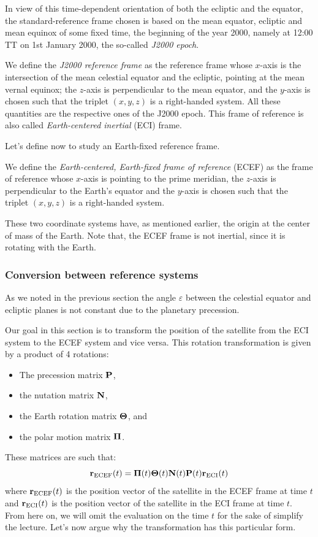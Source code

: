 \documentclass[../main.tex]{subfiles}
\begin{document}
In view of this time-dependent orientation of both the ecliptic and the equator, the standard-reference frame chosen is based on the mean equator, ecliptic and mean equinox of some fixed time, the beginning of the year 2000, namely at 12:00 TT on 1st January 2000, the so-called \emph{J2000 epoch}.
\begin{definition}
  We define the \emph{J2000 reference frame} as the reference frame whose $x$-axis is the intersection of the mean celestial equator and the ecliptic, pointing at the mean vernal equinox; the $z$-axis is perpendicular to the mean equator, and the $y$-axis is chosen such that the triplet $(x,y,z)$ is a right-handed system. All these quantities are the respective ones of the J2000 epoch. This frame of reference is also called \emph{Earth-centered inertial} (ECI) frame.
\end{definition}

Let's define now to study an Earth-fixed reference frame.
\begin{definition}
  We define the \emph{Earth-centered, Earth-fixed frame of reference} (ECEF) as the frame of reference whose $x$-axis is pointing to the prime meridian, the $z$-axis is perpendicular to the Earth's equator and the $y$-axis is chosen such that the triplet $(x,y,z)$ is a right-handed system.
\end{definition}
These two coordinate systems have, as mentioned earlier, the origin at the center of mass of the Earth. Note that, the ECEF frame is not inertial, since it is rotating with the Earth.
\subsubsection{Conversion between reference systems}

As we noted in the previous section the angle $\varepsilon$ between the celestial equator and ecliptic planes is not constant due to the planetary precession.

Our goal in this section is to transform the position of the satellite from the ECI system to the ECEF system and vice versa. This rotation transformation is given by a product of 4 rotations:
\begin{itemize}
  \item The precession matrix $\boldsymbol{\mathrm{P}}$,
  \item the nutation matrix $\boldsymbol{\mathrm{N}}$,
  \item the Earth rotation matrix $\boldsymbol{\mathrm{\Theta}}$, and
  \item the polar motion matrix $\boldsymbol{\mathrm{\Pi}}$.
\end{itemize}
These matrices are such that:
\begin{equation}
  \boldsymbol{\mathrm{r}}_\mathrm{ECEF}(t)=\boldsymbol{\mathrm{\Pi}}(t)\boldsymbol{\mathrm{\Theta}}(t)\boldsymbol{\mathrm{N}}(t)\boldsymbol{\mathrm{P}}(t)\boldsymbol{\mathrm{r}}_\mathrm{ECI}(t)
\end{equation}
where $\boldsymbol{\mathrm{r}}_\mathrm{ECEF}(t)$ is the position vector of the satellite in the ECEF frame at time $t$ and $\boldsymbol{\mathrm{r}}_\mathrm{ECI}(t)$ is the position vector of the satellite in the ECI frame at time $t$. From here on, we will omit the evaluation on the time $t$ for the sake of simplify the lecture. Let's now argue why the transformation has this particular form.
\end{document}
